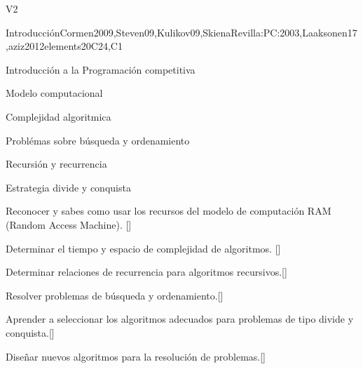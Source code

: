 \begin{syllabus}
  \begin{competences}{V2}
      \item {}
      \item {}
      \item {}
  \end{competences}
  
  \begin{unit}{Introducción}{}{Cormen2009,Steven09,Kulikov09,SkienaRevilla:PC:2003,Laaksonen17,aziz2012elements}{20}{C24,C1}
      \begin{topics}
        \item Introducción a la Programación competitiva
        \item Modelo computacional
        \item Complejidad algoritmica
        \item Problémas sobre búsqueda y ordenamiento
        \item Recursión y recurrencia 
        \item Estrategia divide y conquista
    \end{topics}
    \begin{learningoutcomes}
        \item Reconocer y sabes como usar los recursos del modelo de computación RAM (Random Access Machine). [\Usage]
        \item Determinar el tiempo y espacio de complejidad de algoritmos. [\Usage]
        \item Determinar relaciones de recurrencia para algoritmos recursivos.[\Usage]
        \item Resolver problemas de búsqueda y ordenamiento.[\Usage]
        \item Aprender a seleccionar los algoritmos adecuados para problemas de tipo divide y conquista.[\Usage]
        \item Diseñar nuevos algoritmos para la resolución de problemas.[\Usage]
    \end{learningoutcomes}
  \end{unit}
  

\end{syllabus}

